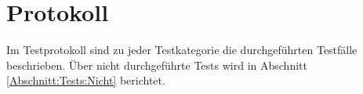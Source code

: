 %



\newpage



\section{Protokoll}
\label{Abschnitt:Tests:Protokoll}

Im Testprotokoll sind zu jeder Testkategorie die durchgeführten Testfälle beschrieben. Über nicht durchgeführte Tests wird in Abschnitt \ref*{Abschnitt:Tests:Nicht} berichtet.









